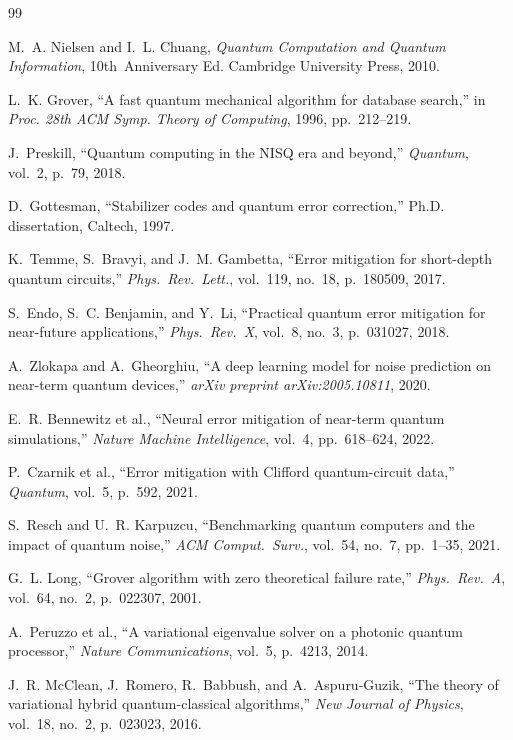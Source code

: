 \documentclass[journal]{IEEEtran}
\begin{document}
\begin{thebibliography}{99}

M.~A. Nielsen and I.~L. Chuang, \emph{Quantum Computation and Quantum Information}, 10th~Anniversary Ed. Cambridge University Press, 2010.

L.~K. Grover, ``A fast quantum mechanical algorithm for database search,'' in \emph{Proc. 28th ACM Symp. Theory of Computing}, 1996, pp.~212--219.

J.~Preskill, ``Quantum computing in the NISQ era and beyond,'' \emph{Quantum}, vol.~2, p.~79, 2018.

D.~Gottesman, ``Stabilizer codes and quantum error correction,'' Ph.D. dissertation, Caltech, 1997.

K.~Temme, S.~Bravyi, and J.~M. Gambetta, ``Error mitigation for short-depth quantum circuits,'' \emph{Phys.\ Rev.\ Lett.}, vol.~119, no.~18, p.~180509, 2017.

S.~Endo, S.~C. Benjamin, and Y.~Li, ``Practical quantum error mitigation for near-future applications,'' \emph{Phys.\ Rev.\ X}, vol.~8, no.~3, p.~031027, 2018.

A.~Zlokapa and A.~Gheorghiu, ``A deep learning model for noise prediction on near-term quantum devices,'' \emph{arXiv preprint arXiv:2005.10811}, 2020.

E.~R. Bennewitz et al., ``Neural error mitigation of near-term quantum simulations,'' \emph{Nature Machine Intelligence}, vol.~4, pp.~618--624, 2022.

P.~Czarnik et al., ``Error mitigation with Clifford quantum-circuit data,'' \emph{Quantum}, vol.~5, p.~592, 2021.

S.~Resch and U.~R. Karpuzcu, ``Benchmarking quantum computers and the impact of quantum noise,'' \emph{ACM Comput.\ Surv.}, vol.~54, no.~7, pp.~1--35, 2021.

G.~L. Long, ``Grover algorithm with zero theoretical failure rate,'' \emph{Phys.\ Rev.\ A}, vol.~64, no.~2, p.~022307, 2001.

A.~Peruzzo et al., ``A variational eigenvalue solver on a photonic quantum processor,'' \emph{Nature Communications}, vol.~5, p.~4213, 2014.

J.~R. McClean, J.~Romero, R.~Babbush, and A.~Aspuru-Guzik, ``The theory of variational hybrid quantum-classical algorithms,'' \emph{New Journal of Physics}, vol.~18, no.~2, p.~023023, 2016.


\end{thebibliography}
\end{document}
